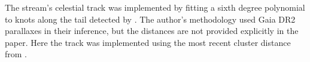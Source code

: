 The stream's celestial track was implemented by fitting a sixth degree polynomial to knots along the tail detected by \citet[][data provided by A. Sollima in priv. comm]{Sollima2020}. The author's methodology used Gaia DR2 parallaxes in their inference, but the distances are not provided explicitly in the paper. Here the track was implemented using the most recent cluster distance from \citet{Baumgardt2021}.
